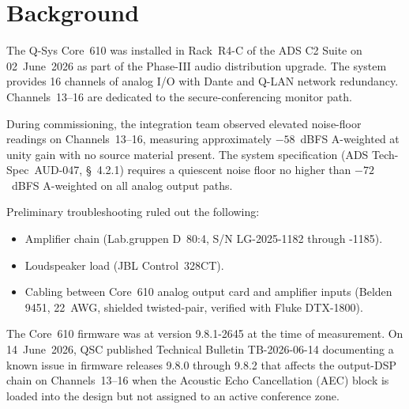\section{Background}

The Q-Sys Core~610 was installed in Rack~R4-C of the ADS C2 Suite on
02~June~2026 as part of the Phase-III audio distribution upgrade. The system
provides 16 channels of analog I/O with Dante and Q-LAN network redundancy.
Channels~13--16 are dedicated to the secure-conferencing monitor path.

During commissioning, the integration team observed elevated noise-floor
readings on Channels~13--16, measuring approximately $-58$~dBFS A-weighted at
unity gain with no source material present. The system specification (ADS
Tech-Spec~AUD-047, \S~4.2.1) requires a quiescent noise floor no higher than
$-72$~dBFS A-weighted on all analog output paths.

Preliminary troubleshooting ruled out the following:
\begin{itemize}[leftmargin=*, nosep, before=\vspace{2pt}, after=\vspace{0pt}]
  \item Amplifier chain (Lab.gruppen D~80:4, S/N LG-2025-1182 through -1185).
  \item Loudspeaker load (JBL Control~328CT).
  \item Cabling between Core~610 analog output card and amplifier inputs
        (Belden 9451, 22~AWG, shielded twisted-pair, verified with
        Fluke DTX-1800).
\end{itemize}

\medskip

The Core~610 firmware was at version 9.8.1-2645 at the time of measurement. On
14~June~2026, QSC published Technical Bulletin TB-2026-06-14 documenting a known
issue in firmware releases 9.8.0 through 9.8.2 that affects the output-DSP
chain on Channels~13--16 when the Acoustic Echo Cancellation (AEC) block is
loaded into the design but not assigned to an active conference zone.


